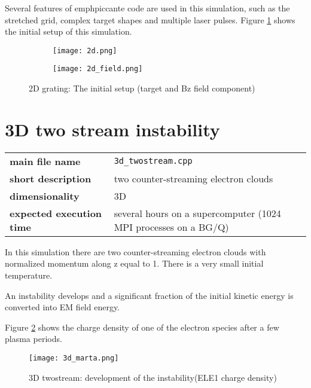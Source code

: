 \documentclass[11pt,a4paper]{report}
\begin{document}
Several features of emph{piccante} code are used in this simulation, such as the stretched grid, complex target shapes and multiple laser pulses. Figure \ref{pic_2dgrt} shows the initial setup of this simulation.

\begin{figure}[htbp]
        \centering
          \begin{subfigure}[c]{0.3\textwidth}
                \texttt{[image: 2d.png]}                
                
        \end{subfigure}
                  \begin{subfigure}[c]{0.4\textwidth}
                \texttt{[image: 2d\_field.png]}                
                
        \end{subfigure}
        \caption{2D grating: The initial setup (target and Bz field component)}
        \label{pic_2dgrt}
\end{figure}

\section{3D two stream instability}
\begin{center}
    \begin{tabular}{ l | l }
    	\textbf{main file name}          & \verb+3d_twostream.cpp+                                          \\
    	\textbf{short description}       & two counter-streaming electron clouds                            \\
    	\textbf{dimensionality}          & 3D                                                               \\
    	\textbf{expected execution time} & several hours on a supercomputer (1024 MPI processes on a BG/Q)
    \end{tabular}
    \end{center}
In this simulation there are two counter-streaming electron clouds with normalized momentum along z equal to 1. There is a very small initial temperature.

An instability develops and a significant fraction of the initial kinetic energy is converted into EM field energy.

Figure \ref{pic_3dtwostream} shows the charge density of one of the electron species after a few plasma periods.
 \begin{figure}[htbp!]
    \centering
    \texttt{[image: 3d\_marta.png]}
    \caption{3D twostream: development of the instability(ELE1 charge density)}
	\label{pic_3dtwostream}    
\end{figure}    
\end{document}

